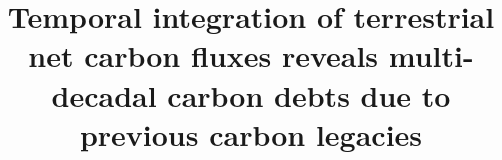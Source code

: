\documentclass[ProofPDF]{./Styles/Jnls-Template-V3}
\begin{document}
\def\MSFirstPage{\pageref{startPage_Label}}
\def\MSLastPage{\pageref{endPage_Label}}
\graphicspath{{./Images/}}
\label{startPage_Label}
\title{Temporal integration of terrestrial net carbon fluxes reveals multi-decadal carbon debts due to previous carbon legacies}


%
%
%
\end{document}

